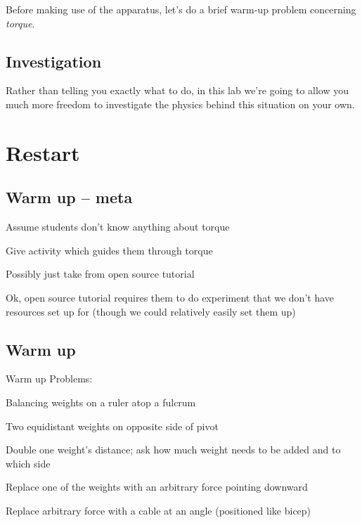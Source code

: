 \documentclass[11pt,letterpaper]{article}
\begin{document}
Before making use of the apparatus,
let's do a brief warm-up problem concerning \emph{torque}.



\subsection*{Investigation}

Rather than telling you exactly what to do, 
in this lab we're going to allow you much more freedom to
investigate the physics behind this situation on your own.

\section*{Restart}

\subsection*{Warm up -- meta }
\itemb
	\item Assume students don't know anything about torque
	\item Give activity which guides them through torque
	\item Possibly just take from open source tutorial
	\item Ok, open source tutorial requires them to do experiment that we don't
		have resources set up for (though we could relatively easily set them up)
\iteme

\subsection*{Warm up}
Warm up Problems:
\enumb
	\item Balancing weights on a ruler atop a fulcrum
		\enumb[label=\alph*.]
			\item Two equidistant weights on opposite side of pivot
			\item Double one weight's distance; ask how much weight needs to be
				added and to which side
		\enume
	\item Replace one of the weights with an arbitrary force pointing downward
	\item Replace arbitrary force with a cable at an angle 
		(positioned like bicep)
\enume
\end{document}

